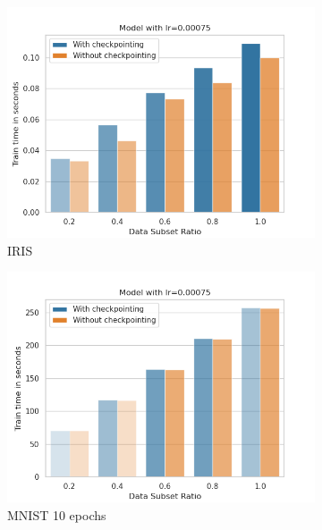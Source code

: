 \begin{figure}[h]
    \centering
    \begin{subfigure}[b]{0.24\textwidth}
        \centering
        \includegraphics[width=\textwidth]{figures/22_07/iris/train_subset_0.00075.png}
        \caption{IRIS}
        \label{fig:9a}
    \end{subfigure}
    \begin{subfigure}[b]{0.24\textwidth}
        \centering
        \includegraphics[width=\textwidth]{figures/22_07/10ep/train_subset_0.00075.png}
        \caption{MNIST 10 epochs}
        \label{fig:9b}
    \end{subfigure}
    \begin{subfigure}[b]{0.24\textwidth}

\end{subfigure}
\end{figure}
